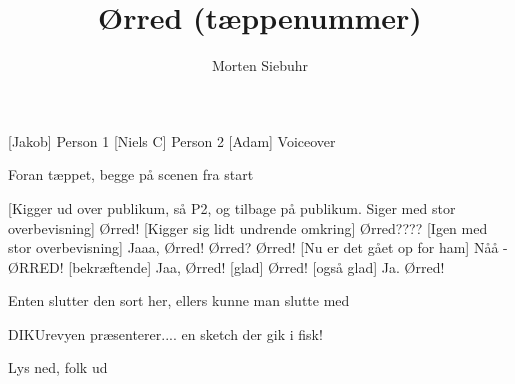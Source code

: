 \documentclass[a4paper,11pt]{article}
\title{Ørred (tæppenummer)}
\author{Morten Siebuhr}
\begin{document}
\maketitle

\begin{roles}
[Jakob] Person 1
[Niels C] Person 2
[Adam] Voiceover
\end{roles}

\begin{sketch}

\scene Foran tæppet, begge på scenen fra start

[Kigger ud over publikum, så P2, og tilbage på publikum. Siger
med stor overbevisning] Ørred!
[Kigger sig lidt undrende omkring] Ørred???? 
[Igen med stor overbevisning] Jaaa, Ørred!
 Ørred? 
 Ørred!
[Nu er det gået op for ham] Nåå - ØRRED!
[bekræftende] Jaa, Ørred!
[glad] Ørred!
[også glad] Ja. Ørred!

\scene Enten slutter den sort her, ellers kunne man slutte med

 DIKUrevyen præsenterer.... en sketch der gik i fisk!

\scene Lys ned, folk ud

\end{sketch}
\end{document}
